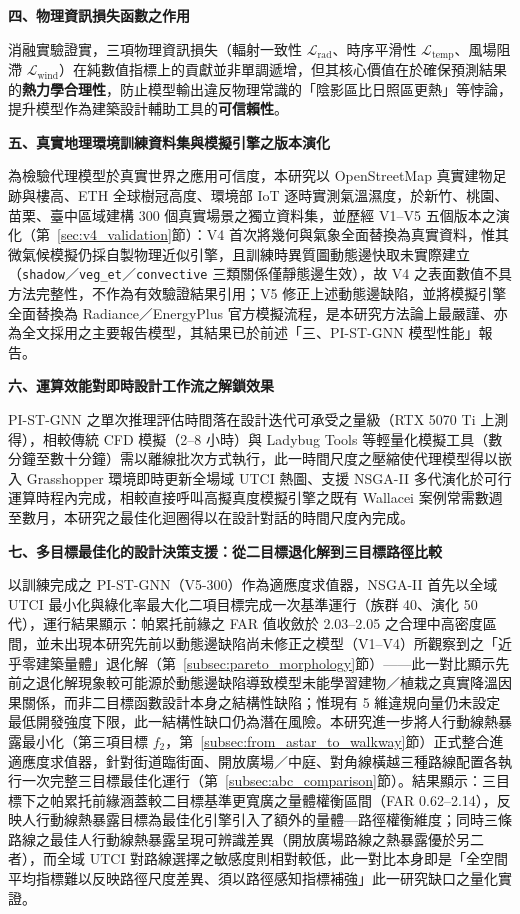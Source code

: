 \noindent\textbf{四、物理資訊損失函數之作用}

消融實驗證實，三項物理資訊損失（輻射一致性 $\mathcal{L}_{\text{rad}}$、時序平滑性 $\mathcal{L}_{\text{temp}}$、風場阻滯 $\mathcal{L}_{\text{wind}}$）在純數值指標上的貢獻並非單調遞增，但其核心價值在於確保預測結果的\textbf{熱力學合理性}，防止模型輸出違反物理常識的「陰影區比日照區更熱」等悖論，提升模型作為建築設計輔助工具的\textbf{可信賴性}。

\noindent\textbf{五、真實地理環境訓練資料集與模擬引擎之版本演化}

為檢驗代理模型於真實世界之應用可信度，本研究以 OpenStreetMap 真實建物足跡與樓高、ETH 全球樹冠高度、環境部 IoT 逐時實測氣溫濕度，於新竹、桃園、苗栗、臺中區域建構 300 個真實場景之獨立資料集，並歷經 V1--V5 五個版本之演化（第~\ref{sec:v4_validation}節）：V4 首次將幾何與氣象全面替換為真實資料，惟其微氣候模擬仍採自製物理近似引擎，且訓練時異質圖動態邊快取未實際建立（\texttt{shadow}／\texttt{veg\_et}／\texttt{convective} 三類關係僅靜態邊生效），故 V4 之表面數值不具方法完整性，不作為有效驗證結果引用；V5 修正上述動態邊缺陷，並將模擬引擎全面替換為 Radiance／EnergyPlus 官方模擬流程，是本研究方法論上最嚴謹、亦為全文採用之主要報告模型，其結果已於前述「三、PI-ST-GNN 模型性能」報告。

\noindent\textbf{六、運算效能對即時設計工作流之解鎖效果}

PI-ST-GNN 之單次推理評估時間落在設計迭代可承受之量級（RTX 5070 Ti 上測得），相較傳統 CFD 模擬（2--8 小時）與 Ladybug Tools 等輕量化模擬工具（數分鐘至數十分鐘）需以離線批次方式執行，此一時間尺度之壓縮使代理模型得以嵌入 Grasshopper 環境即時更新全場域 UTCI 熱圖、支援 NSGA-II 多代演化於可行運算時程內完成，相較直接呼叫高擬真度模擬引擎之既有 Wallacei 案例常需數週至數月，本研究之最佳化迴圈得以在設計對話的時間尺度內完成。

\noindent\textbf{七、多目標最佳化的設計決策支援：從二目標退化解到三目標路徑比較}

以訓練完成之 PI-ST-GNN（V5-300）作為適應度求值器，NSGA-II 首先以全域 UTCI 最小化與綠化率最大化二項目標完成一次基準運行（族群 40、演化 50 代），運行結果顯示：帕累托前緣之 FAR 值收斂於 2.03--2.05 之合理中高密度區間，並未出現本研究先前以動態邊缺陷尚未修正之模型（V1--V4）所觀察到之「近乎零建築量體」退化解（第~\ref{subsec:pareto_morphology}節）——此一對比顯示先前之退化解現象較可能源於動態邊缺陷導致模型未能學習建物／植栽之真實降溫因果關係，而非二目標函數設計本身之結構性缺陷；惟現有 5 維違規向量仍未設定最低開發強度下限，此一結構性缺口仍為潛在風險。本研究進一步將人行動線熱暴露最小化（第三項目標 $f_2$，第~\ref{subsec:from_astar_to_walkway}節）正式整合進適應度求值器，針對街道臨街面、開放廣場／中庭、對角線橫越三種路線配置各執行一次完整三目標最佳化運行（第~\ref{subsec:abc_comparison}節）。結果顯示：三目標下之帕累托前緣涵蓋較二目標基準更寬廣之量體權衡區間（FAR 0.62--2.14），反映人行動線熱暴露目標為最佳化引擎引入了額外的量體—路徑權衡維度；同時三條路線之最佳人行動線熱暴露呈現可辨識差異（開放廣場路線之熱暴露優於另二者），而全域 UTCI 對路線選擇之敏感度則相對較低，此一對比本身即是「全空間平均指標難以反映路徑尺度差異、須以路徑感知指標補強」此一研究缺口之量化實證。


